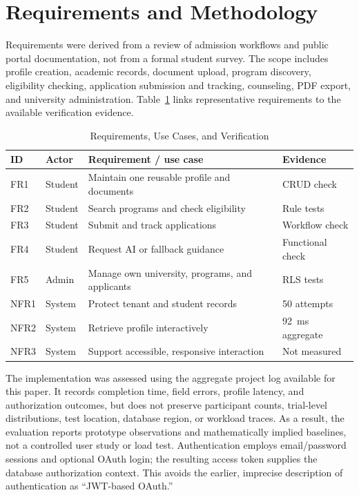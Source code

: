 \documentclass[conference,letterpaper]{IEEEtran}
\begin{document}
\section{Requirements and Methodology}
Requirements were derived from a review of admission workflows and public portal documentation, not from a formal student survey. The scope includes profile creation, academic records, document upload, program discovery, eligibility checking, application submission and tracking, counseling, PDF export, and university administration. Table~\ref{tab:req} links representative requirements to the available verification evidence.

\begin{table}[!t]
\caption{Requirements, Use Cases, and Verification}
\label{tab:req}
\centering\scriptsize
\setlength{\tabcolsep}{2.1pt}\renewcommand{\arraystretch}{1.08}
\begin{tabularx}{\columnwidth}{@{}l l X l@{}}
\toprule
ID & Actor & Requirement / use case & Evidence\\
\midrule
FR1 & Student & Maintain one reusable profile and documents & CRUD check\\
FR2 & Student & Search programs and check eligibility & Rule tests\\
FR3 & Student & Submit and track applications & Workflow check\\
FR4 & Student & Request AI or fallback guidance & Functional check\\
FR5 & Admin & Manage own university, programs, and applicants & RLS tests\\
NFR1 & System & Protect tenant and student records & 50 attempts\\
NFR2 & System & Retrieve profile interactively & 92~ms aggregate\\
NFR3 & System & Support accessible, responsive interaction & Not measured\\
\bottomrule
\end{tabularx}
\end{table}

The implementation was assessed using the aggregate project log available for this paper. It records completion time, field errors, profile latency, and authorization outcomes, but does not preserve participant counts, trial-level distributions, test location, database region, or workload traces. As a result, the evaluation reports prototype observations and mathematically implied baselines, not a controlled user study or load test. Authentication employs email/password sessions and optional OAuth login; the resulting access token supplies the database authorization context. This avoids the earlier, imprecise description of authentication as “JWT-based OAuth.”
\end{document}

